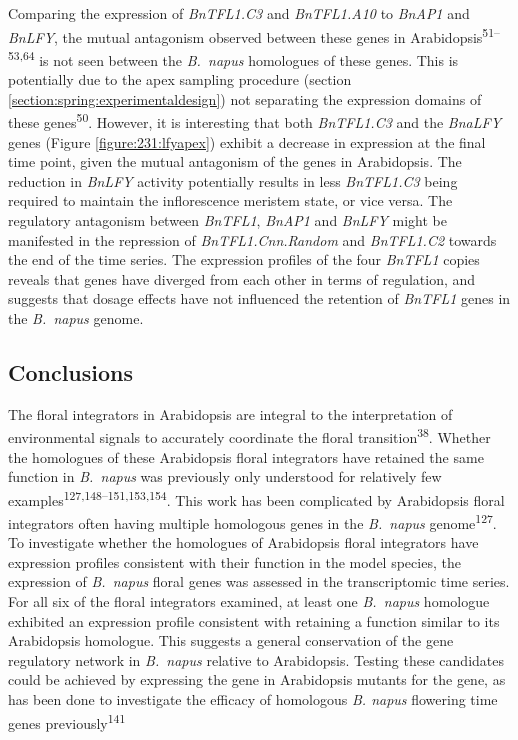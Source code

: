 \documentclass[12pt,]{book}
\begin{document}
Comparing the expression of \emph{BnTFL1.C3} and \emph{BnTFL1.A10} to
\emph{BnAP1} and \emph{BnLFY}, the mutual antagonism observed between
these genes in Arabidopsis\textsuperscript{51--53,64} is not seen
between the \emph{B.~napus} homologues of these genes. This is
potentially due to the apex sampling procedure (section
\ref{section:spring:experimentaldesign}) not separating the expression
domains of these genes\textsuperscript{50}. However, it is interesting
that both \emph{BnTFL1.C3} and the \emph{BnaLFY} genes (Figure
\ref{figure:231:lfyapex}) exhibit a decrease in expression at the final
time point, given the mutual antagonism of the genes in Arabidopsis. The
reduction in \emph{BnLFY} activity potentially results in less
\emph{BnTFL1.C3} being required to maintain the inflorescence meristem
state, or vice versa. The regulatory antagonism between \emph{BnTFL1},
\emph{BnAP1} and \emph{BnLFY} might be manifested in the repression of
\emph{BnTFL1.Cnn.Random} and \emph{BnTFL1.C2} towards the end of the
time series. The expression profiles of the four \emph{BnTFL1} copies
reveals that genes have diverged from each other in terms of regulation,
and suggests that dosage effects have not influenced the retention of
\emph{BnTFL1} genes in the \emph{B.~napus} genome.

\subsection{Conclusions}\label{conclusions-2}

The floral integrators in Arabidopsis are integral to the interpretation
of environmental signals to accurately coordinate the floral
transition\textsuperscript{38}. Whether the homologues of these
Arabidopsis floral integrators have retained the same function in
\emph{B.~napus} was previously only understood for relatively few
examples\textsuperscript{127,148--151,153,154}. This work has been
complicated by Arabidopsis floral integrators often having multiple
homologous genes in the \emph{B.~napus} genome\textsuperscript{127}. To
investigate whether the homologues of Arabidopsis floral integrators
have expression profiles consistent with their function in the model
species, the expression of \emph{B.~napus} floral genes was assessed in
the transcriptomic time series. For all six of the floral integrators
examined, at least one \emph{B.~napus} homologue exhibited an expression
profile consistent with retaining a function similar to its Arabidopsis
homologue. This suggests a general conservation of the gene regulatory
network in \emph{B.~napus} relative to Arabidopsis. Testing these
candidates could be achieved by expressing the gene in Arabidopsis
mutants for the gene, as has been done to investigate the efficacy of
homologous \emph{B. napus} flowering time genes
previously\textsuperscript{141}
\end{document}
